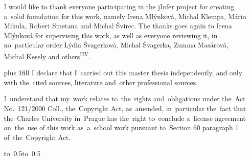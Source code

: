 \documentclass[a4paper,12pt,twoside]{report}
\theoremstyle{definition}
\let\openright=\clearpage
\begin{document}
\newpage %
\openright

\noindent
I would like to thank everyone participating in the jInfer project for creating a~solid foundation for this work, namely Irena Mlýn\-ko\-vá, Mi\-chal Klem\-pa, Má\-rio Mi\-ku\-la, Ro\-bert Sme\-ta\-na and Mi\-chal Švi\-rec. The thanks goes again to Irena Mlýn\-ko\-vá for supervising this work, as well as everyone reviewing it, in no~particular order Lý\-dia Šva\-ger\-ko\-vá, Mi\-chal Šva\-ger\-ka, Zu\-za\-na Ma\-sá\-ro\-vá, Mi\-chal Ke\-se\-ly and others\textsuperscript{HV}.

\newpage %
\vglue 0pt plus 1fill
\noindent
I declare that I~carried out this master thesis independently, and only with the~cited sources, literature and~other professional sources.

\medskip\noindent
I~understand that my~work relates to~the~rights and~obligations under the~Act No.~121/2000 Coll., the~Copyright Act, as~amended, in~particular the~fact that the~Charles University in~Prague has the~right to~conclude a~license agreement on~the~use of this work as~a~school work pursuant to~Section 60 paragraph 1 of~the~Copyright Act.

\vspace{10mm}

\hbox{\hbox to 0.5\hbox to 0.5\hsize{%

\hss}}

\vspace{20mm}
\end{document}
